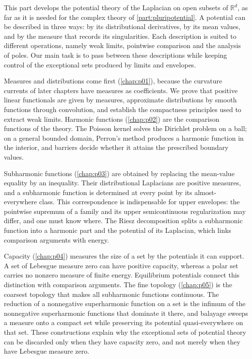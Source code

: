 \label{intro:potential}

This part develops the potential theory of the Laplacian on open subsets of $\mathbb R^d$, as far as it is needed for the complex theory of \cref{part:pluripotential}. A potential can be described in three ways: by its distributional derivatives, by its mean values, and by the measure that records its singularities. Each description is suited to different operations, namely weak limits, pointwise comparison and the analysis of poles. Our main task is to pass between these descriptions while keeping control of the exceptional sets produced by limits and envelopes.

Measures and distributions come first (\cref{chap:p01}), because the curvature currents of later chapters have measures as coefficients. We prove that positive linear functionals are given by measures, approximate distributions by smooth functions through convolution, and establish the compactness principles used to extract weak limits. Harmonic functions (\cref{chap:p02}) are the comparison functions of the theory. The Poisson kernel solves the Dirichlet problem on a ball; on a general bounded domain, Perron's method produces a harmonic function in the interior, and barriers decide whether it attains the prescribed boundary values.

Subharmonic functions (\cref{chap:p03}) are obtained by replacing the mean-value equality by an inequality. Their distributional Laplacians are positive measures, and a subharmonic function is determined at every point by its almost-everywhere class. This correspondence is indispensable for upper envelopes: the pointwise supremum of a family and its upper semicontinuous regularization may differ, and one must know where. The Riesz decomposition splits a subharmonic function into a harmonic part and the potential of its Laplacian, which links comparison arguments with energy.

Capacity (\cref{chap:p04}) measures the size of a set by the potentials it can support. A set of Lebesgue measure zero can have positive capacity, whereas a polar set carries no nonzero measure of finite energy. Equilibrium potentials connect this distinction with comparison arguments. The fine topology (\cref{chap:p05}) is the coarsest topology that makes all subharmonic functions continuous. The reduction of a nonnegative superharmonic function on a set is the infimum of the nonnegative superharmonic functions that dominate it there, and balayage sweeps a measure onto a compact set while preserving its potential quasi-everywhere on that set. These constructions explain why the exceptional sets of potential theory can be discarded only when they have capacity zero, and not merely when they have Lebesgue measure zero.

